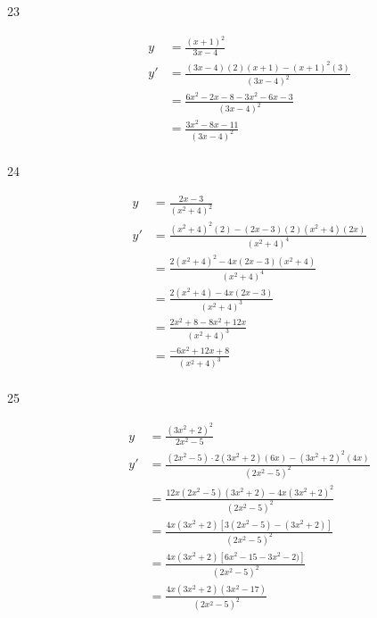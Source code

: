 \documentclass{exam}
\begin{document}
\begin{description}
\item[23]
\begin{align*}
  y  &= \frac{(x+1)^2}{3x-4} \\
  y' &= \frac{(3x-4)(2)(x+1) - (x+1)^2(3)}{(3x - 4)^2} \\
     &= \frac{6x^2 - 2x - 8 - 3x^2 - 6x -3}{(3x - 4)^2} \\
     &= \frac{3x^2 - 8x - 11}{(3x - 4)^2} \\
\end{align*}

\item[24]
\begin{align*}
  y  &= \frac{2x - 3}{(x^2 + 4)^2} \\
  y' &= \frac{ (x^2 + 4)^2(2) - (2x - 3)(2)(x^2 + 4)(2x) }{(x^2 + 4)^4}  \\
     &= \frac{ 2(x^2 + 4)^2 - 4x(2x - 3)(x^2 + 4) }{(x^2 + 4)^4}  \\
     &= \frac{ 2(x^2 + 4) - 4x(2x - 3) }{(x^2 + 4)^3}  \\
     &= \frac{ 2x^2 + 8 - 8x^2 + 12x }{(x^2 + 4)^3}  \\
     &= \frac{ -6x^2 + 12x + 8 }{(x^2 + 4)^3}  \\
\end{align*}

\item[25]
\begin{align*}
  y  &= \frac{(3x^2 + 2)^2}{2x^2 - 5} \\
  y' &= \frac{(2x^2 - 5) \cdot 2(3x^2 + 2)(6x) -(3x^2 + 2)^2(4x) } {(2x^2 - 5)^2} \\
     &= \frac{12x (2x^2 - 5)(3x^2 + 2) - 4x(3x^2 + 2)^2 } {(2x^2 - 5)^2} \\
     &= \frac{4x(3x^2 + 2) [ 3(2x^2 - 5) - (3x^2 + 2)] } {(2x^2 - 5)^2} \\
     &= \frac{4x(3x^2 + 2) [ 6x^2 - 15 - 3x^2 - 2)] } {(2x^2 - 5)^2} \\
     &= \frac{4x(3x^2 + 2) (3x^2 - 17) } {(2x^2 - 5)^2} \\
\end{align*}



\end{description}
\end{document}
